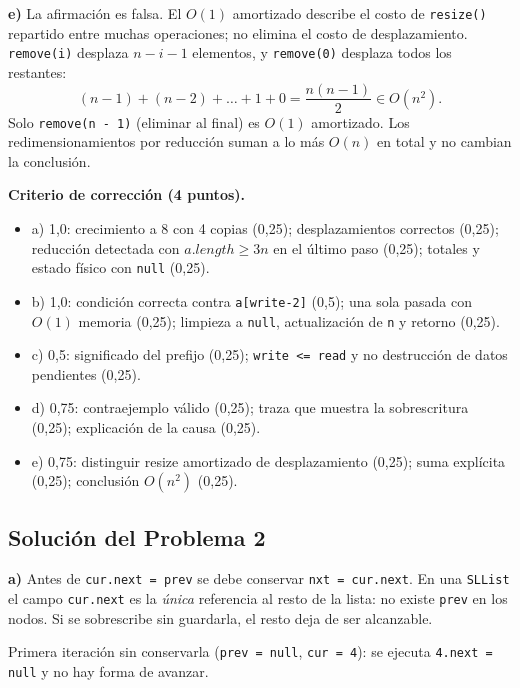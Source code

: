 \documentclass[11pt,a4paper]{article}
\begin{document}
\textbf{e)} La afirmación es falsa. El $O(1)$ amortizado describe el costo de \texttt{resize()} repartido entre muchas operaciones; no elimina el costo de desplazamiento. \texttt{remove(i)} desplaza $n - i - 1$ elementos, y \texttt{remove(0)} desplaza todos los restantes:
\[
(n-1) + (n-2) + \dots + 1 + 0 = \frac{n(n-1)}{2} \in O(n^2).
\]
Solo \texttt{remove(n - 1)} (eliminar al final) es $O(1)$ amortizado. Los redimensionamientos por reducción suman a lo más $O(n)$ en total y no cambian la conclusión.

\textbf{Criterio de corrección (4 puntos).}
\begin{itemize}[itemsep=0pt]
\item a) 1,0: crecimiento a 8 con 4 copias (0,25); desplazamientos correctos (0,25); reducción detectada con $a.length \ge 3n$ en el último paso (0,25); totales y estado físico con \texttt{null} (0,25).
\item b) 1,0: condición correcta contra \texttt{a[write-2]} (0,5); una sola pasada con $O(1)$ memoria (0,25); limpieza a \texttt{null}, actualización de \texttt{n} y retorno (0,25).
\item c) 0,5: significado del prefijo (0,25); \texttt{write <= read} y no destrucción de datos pendientes (0,25).
\item d) 0,75: contraejemplo válido (0,25); traza que muestra la sobrescritura (0,25); explicación de la causa (0,25).
\item e) 0,75: distinguir resize amortizado de desplazamiento (0,25); suma explícita (0,25); conclusión $O(n^2)$ (0,25).
\end{itemize}

\newpage
\subsection*{Solución del Problema 2}

\textbf{a)} Antes de \texttt{cur.next = prev} se debe conservar \texttt{nxt = cur.next}. En una \texttt{SLList} el campo \texttt{cur.next} es la \emph{única} referencia al resto de la lista: no existe \texttt{prev} en los nodos. Si se sobrescribe sin guardarla, el resto deja de ser alcanzable.

Primera iteración sin conservarla (\texttt{prev = null}, \texttt{cur = 4}): se ejecuta \texttt{4.next = null} y no hay forma de avanzar.

\begin{center}
\end{center}
\end{document}
